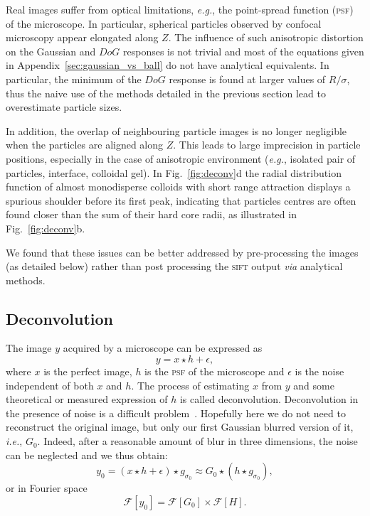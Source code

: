 \documentclass[8.5pt,twoside,twocolumn]{article}
\begin{document}
Real images suffer from optical limitations, \emph{e.g.}, the point-spread function (\textsc{psf}) of the microscope. In particular, spherical particles observed by confocal microscopy appear elongated along $Z$. The influence of such anisotropic distortion on the Gaussian and $DoG$ responses is not trivial and most of the equations given in Appendix~\ref{sec:gaussian_vs_ball} do not have analytical equivalents. In particular, the minimum of the $DoG$ response is found at larger values of $R/\sigma$, thus the naive use of the methods detailed in the previous section lead to overestimate particle sizes.

In addition, the overlap of neighbouring particle images is no longer negligible when the particles are aligned along $Z$. This leads to large imprecision in particle positions, especially in the case of anisotropic environment (\emph{e.g.}, isolated pair of particles, interface, colloidal gel). In Fig.~\ref{fig:deconv}d the radial distribution function of almost monodisperse colloids with short range attraction displays a spurious shoulder before its first peak, indicating that particles centres are often found closer than the sum of their hard core radii, as illustrated in Fig.~\ref{fig:deconv}b.

We found that these issues can be better addressed by pre-processing the images (as detailed below) rather than post processing the \textsc{sift} output \emph{via} analytical methods.

\subsection{Deconvolution}
The image $y$ acquired by a microscope can be expressed as 
\begin{equation}
y = x \star h + \epsilon,
\end{equation}
where $x$ is the perfect image, $h$ is the \textsc{psf} of the microscope and $\epsilon$ is the noise independent of both $x$ and $h$. The process of estimating $x$ from $y$ and some theoretical or measured expression of $h$ is called deconvolution. Deconvolution in the presence of noise is a difficult problem~\cite{Riad1986}. Hopefully here we do not need to reconstruct the original image, but only our first Gaussian blurred version of it, \emph{i.e.}, $G_0$. Indeed, after a reasonable amount of blur in three dimensions, the noise can be neglected and we thus obtain:
\begin{equation}
y_0 = (x \star h + \epsilon) \star g_{\sigma_0} \approx G_0 \star (h \star g_{\sigma_0}),
\end{equation}
or in Fourier space
\begin{equation}
\mathcal{F}[y_0] = \mathcal{F}[G_0] \times \mathcal{F}[H]. 
\label{eq:Fourier_conv}
\end{equation}
\end{document}
